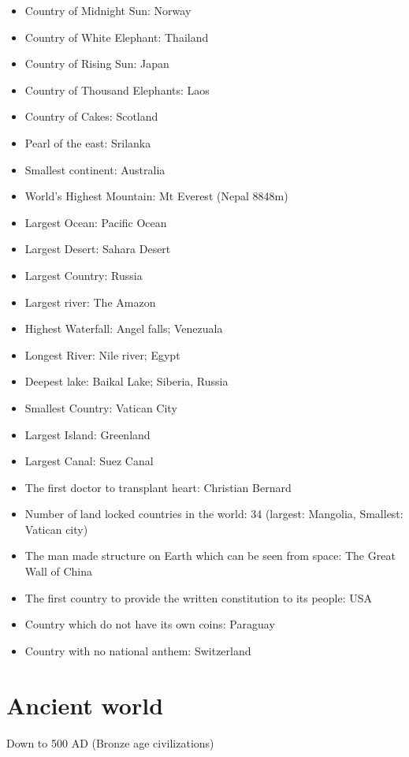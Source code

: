\documentclass[
  openany]{book}
\begin{document}
\begin{itemize}
\item
  Country of Midnight Sun: Norway
\item
  Country of White Elephant: Thailand
\item
  Country of Rising Sun: Japan
\item
  Country of Thousand Elephants: Laos
\item
  Country of Cakes: Scotland
\item
  Pearl of the east: Srilanka
\item
  Smallest continent: Australia
\item
  World's Highest Mountain: Mt Everest (Nepal 8848m)
\item
  Largest Ocean: Pacific Ocean
\item
  Largest Desert: Sahara Desert
\item
  Largest Country: Russia
\item
  Largest river: The Amazon
\item
  Highest Waterfall: Angel falls; Venezuala
\item
  Longest River: Nile river; Egypt
\item
  Deepest lake: Baikal Lake; Siberia, Russia
\item
  Smallest Country: Vatican City
\item
  Largest Island: Greenland
\item
  Largest Canal: Suez Canal
\item
  The first doctor to transplant heart: Christian Bernard
\item
  Number of land locked countries in the world: 34 (largest: Mangolia, Smallest: Vatican city)
\item
  The man made structure on Earth which can be seen from space: The Great Wall of China
\item
  The first country to provide the written constitution to its people: USA
\item
  Country which do not have its own coins: Paraguay
\item
  Country with no national anthem: Switzerland
\end{itemize}

\hypertarget{ancient-world}{%
\section{Ancient world}\label{ancient-world}}

Down to 500 AD (Bronze age civilizations)
\end{document}
